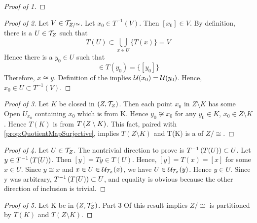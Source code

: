 \begin{prop}
\begin{proof}[Proof of 1]
    \end{proof}
    \begin{proof}[Proof of 2]
        Let $V \in \mathcal{T}_{Z/\cong}$. 
        Let $x_0 \in T^{-1}(V)$. 
        Then $[x_0] \in V$. 
        By definition, there is a $U \in \mathcal{T}_Z$ such that 
        \begin{equation}
            T(U) \subset \bigcup\limits_{x \in U} \{T(x)\}=V
        \end{equation}
        Hence there is a $y_0 \in U$  such that 
        \begin{equation}
            [x_0] \in T(y_0) = \{[y_0]\}
        \end{equation}
        Therefore, $x \cong y$. 
        Definition of the 
		\RelationOfEqualNeighborhoodFilters 
		implies $\mathcal{U}(x_0)=\mathcal{U}(y_0)$. 
        Hence, $x_0 \in U \subset T^{-1}(V)$.
    \end{proof}
    \begin{proof}[Proof of 3]
        Let $K$ be closed in $(Z,\mathcal{T}_Z)$. 
        Then each point $x_0$ in $Z\setminus K$ has some 
        Open $U_{x_0}$ containing $x_0$
        which is 
		\Disjoint 
		from K.
        Hence $y_0 \not \cong x_0$ for any $y_0 \in K$, $x_0 \in Z\setminus K$. 
        Hence $T(K)$ is 
		\Disjoint 
		from $T\left( Z \setminus K\right)$. 
        This fact, paired with \ref{prop:QuotientMapSurjective}, implies $T(Z\setminus K)$ and T(K) 
		is a \Partition of $Z/\cong$.
    \end{proof}
    \begin{proof}[Proof of 4]
        Let $U \in \mathcal{T}_Z$. 
        The nontrivial direction to prove is $T^{-1}\left( T(U)\right) \subset U$.
        Let $y \in T^{-1}\left( T(U)\right)$. 
        Then $[y]=Ty \in T(U)$.
        Hence, $[y]=T(x)=[x]$ for some $x \in U$. 
        Since $y \cong x$ and $x \in U \in \mathcal{U}_{\mathcal{T}_Z}(x)$, we have $U \in \mathcal{U}_{\mathcal{T}_Z}(y)$. 
        Hence $y \in U$.
        Since y was arbitrary, $T^{-1}\left( T(U)\right) \subset U$, and equality is obvious because the other direction of inclusion is trivial. 
    \end{proof}
    \begin{proof}[Proof of 5]
        Let K be 
		\SetClosed 
		in $(Z,\mathcal{T}_Z)$. Part 3 Of this result implies $Z/\cong$ is partitioned by $T(K)$ and $T(Z\setminus K)$. 
        

\end{proof}
\end{prop}
